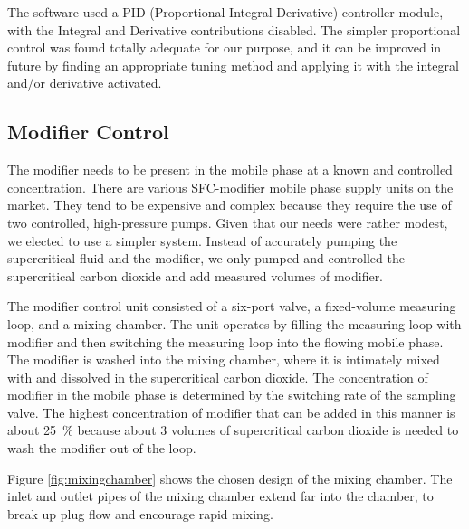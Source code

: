 The software used a PID (Proportional-Integral-Derivative) controller module,
with the Integral and Derivative contributions disabled. The simpler
proportional control was found totally adequate for our purpose, and it can be
improved in future by finding an appropriate tuning method and applying it with
the integral and/or derivative activated.



\subsection{Modifier Control}

The modifier needs to be present in the mobile phase at a known and controlled
concentration. There are various SFC-modifier mobile phase supply units on the
market. They tend to be expensive and complex because they require the use of
two controlled, high-pressure pumps. Given that our needs were rather modest, we
elected to use a simpler system. Instead of accurately pumping the supercritical
fluid and the modifier, we only pumped and controlled the supercritical carbon
dioxide and add measured volumes of modifier.

The modifier control unit consisted of a six-port valve, a fixed-volume
measuring loop, and a mixing chamber. The unit operates by filling the measuring
loop with modifier and then switching the measuring loop into the flowing mobile
phase. The modifier is washed into the mixing chamber, where it is intimately
mixed with and dissolved in the supercritical carbon dioxide. The concentration
of modifier in the mobile phase is determined by the switching rate of the
sampling valve. The highest concentration of modifier that can be added in this
manner is about \SI{25}{\percent} because about 3 volumes of supercritical
carbon dioxide is needed to wash the modifier out of the loop.

Figure \ref{fig:mixingchamber} shows the chosen design of the mixing chamber.
The inlet and outlet pipes of the mixing chamber extend far into the chamber, to
break up plug flow and encourage rapid mixing.  

